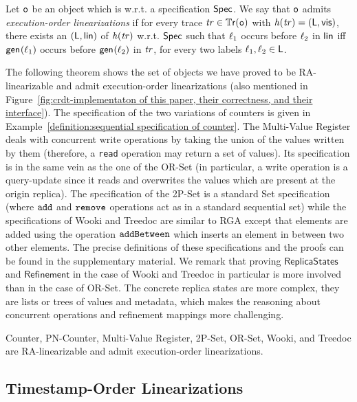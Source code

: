 \begin{definition}\label{def:exec_order}
  Let $\mathtt{o}$ be an object which is \crdtlinearizable{} w.r.t. a specification $\mathsf{Spec}$. We say that $\mathtt{o}$ admits \emph{execution-order linearizations} if for every trace $\mathit{tr}\in\mathbb{T}\mathsf{r}(\mathtt{o})$ with $\mathit{h}({\mathit{tr})}=(\mathsf{L},\mathsf{vis})$, there exists an \crdtlinearization{} $(\mathsf{L},\mathsf{lin})$ of $\mathit{h}({\mathit{tr})}$ w.r.t. $\mathsf{Spec}$ such that $\ell_1$ occurs before $\ell_2$ in $\mathsf{lin}$ iff $\mathsf{gen}_{}(\ell_1)$ occurs before $\mathsf{gen}_{}(\ell_2)$ in $\mathit{tr}$, for every two labels $\ell_1,\ell_2\in\mathsf{L}$.
\end{definition}

The following theorem shows the set of objects we have proved to be
RA-linearizable and admit execution-order linearizations (also
mentioned in Figure~\ref{fig:crdt-implementaton of this paper, their
  correctness, and their interface}). The specification of the two
variations of counters is given in Example~\ref{definition:sequential
  specification of counter}. The Multi-Value Register deals with
concurrent write operations by taking the union of the values written
by them (therefore, a {\tt read} operation may return a set of
values).
Its specification is in the same vein as the one of the OR-Set (in particular, a write operation is a query-update since it reads and overwrites the values which are present at the origin replica). The specification of the 2P-Set is a standard Set specification (where ${\tt add}$ and ${\tt remove}$ operations act as in a standard sequential set) while the specifications of Wooki and Treedoc are similar to RGA except that elements are added using the operation ${\tt addBetween}$ which inserts an element in between two other elements. The precise definitions of these specifications and the proofs can be found in the supplementary material. We remark that proving $\mathsf{ReplicaStates}$ and $\mathsf{Refinement}$ in the case of Wooki and Treedoc in particular is more involved than in the case of OR-Set. The concrete replica states are more complex, they are lists or trees of values and metadata, which makes the reasoning about concurrent operations and refinement mappings more challenging.
\begin{theorem}\label{th:execution_order_objects}
Counter, PN-Counter, Multi-Value Register, 2P-Set, OR-Set, Wooki, and Treedoc are RA-linearizable and admit execution-order linearizations.
\end{theorem}

\subsection{Timestamp-Order Linearizations}
\label{subsec:time-stamp order as linearizabtion}

